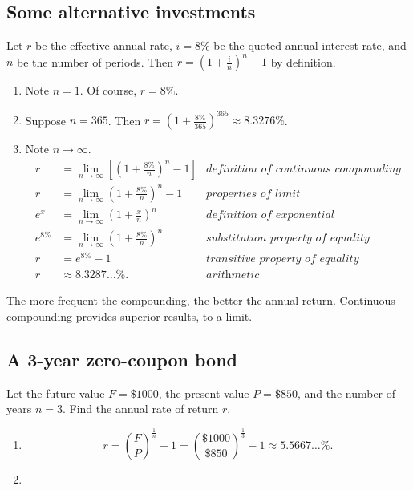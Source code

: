 \documentclass[12pt]{article}
\begin{document}
\subsection{Some alternative investments}
Let $r$ be the effective annual rate, $i=8\%$ be the quoted annual interest rate, and $n$ be the number of periods. Then $r=\left(1+\frac{i}{n}\right)^n-1$ by definition.
\begin{enumerate}
\item Note $n=1$. Of course, $r=8\%$.
\item Suppose $n=365$. Then $r=\left(1+\frac{8\%}{365}\right)^{365}\approx 8.3276\%$.
\item Note $n\to\infty$.
\begin{align*}
r&=\lim_{n\to\infty}{\left[\left(1+\frac{8\%}{n}\right)^n-1\right]}&\textit{definition of continuous compounding}\\
r&=\lim_{n\to\infty}{\left(1+\frac{8\%}{n}\right)^n}-1&\textit{properties of limit}\\
e^x&=\lim_{n\to\infty}{\left(1+\frac{x}{n}\right)^n}&\textit{definition of exponential}\\
e^{8\%}&=\lim_{n\to\infty}{\left(1+\frac{8\%}{n}\right)^n}&\textit{substitution property of equality}\\
r&=e^{8\%}-1&\textit{transitive property of equality}\\
r&\approx 8.3287\dots\%.&\textit{arithmetic}
\end{align*}
\end{enumerate}
The more frequent the compounding, the better the annual return. Continuous compounding provides superior results, to a limit.
\subsection{A 3-year zero-coupon bond}
Let the future value $F=\$1000$, the present value $P=\$850$, and the number of years $n=3$. Find the annual rate of return $r$.
\begin{enumerate}
\item\[r=\left(\frac{F}{P}\right)^{\frac{1}{n}}-1=\left(\frac{\$1000}{\$850}\right)^{\frac{1}{3}}-1\approx 5.5667\dots\%.\]
\item
\begin{align*}
\end{align*}
\end{enumerate}
\end{document}
